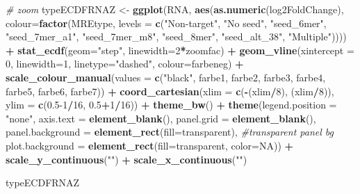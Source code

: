 \documentclass[
]{article}
\newenvironment{Shaded}{\begin{snugshade}}{\end{snugshade}}
\newcommand{\AttributeTok}[1]{\textcolor[rgb]{0.13,0.29,0.53}{#1}}
\newcommand{\CommentTok}[1]{\textcolor[rgb]{0.56,0.35,0.01}{\textit{#1}}}
\newcommand{\ConstantTok}[1]{\textcolor[rgb]{0.56,0.35,0.01}{#1}}
\newcommand{\DecValTok}[1]{\textcolor[rgb]{0.00,0.00,0.81}{#1}}
\newcommand{\FloatTok}[1]{\textcolor[rgb]{0.00,0.00,0.81}{#1}}
\newcommand{\FunctionTok}[1]{\textcolor[rgb]{0.13,0.29,0.53}{\textbf{#1}}}
\newcommand{\NormalTok}[1]{#1}
\newcommand{\OtherTok}[1]{\textcolor[rgb]{0.56,0.35,0.01}{#1}}
\newcommand{\SpecialCharTok}[1]{\textcolor[rgb]{0.81,0.36,0.00}{\textbf{#1}}}
\newcommand{\StringTok}[1]{\textcolor[rgb]{0.31,0.60,0.02}{#1}}
\begin{document}
\begin{Shaded}
\begin{Highlighting}[]
\CommentTok{\# zoom}
\NormalTok{typeECDFRNAZ }\OtherTok{\textless{}{-}} \FunctionTok{ggplot}\NormalTok{(RNA, }\FunctionTok{aes}\NormalTok{(}\FunctionTok{as.numeric}\NormalTok{(log2FoldChange), }
                              \AttributeTok{colour=}\FunctionTok{factor}\NormalTok{(MREtype, }\AttributeTok{levels =} \FunctionTok{c}\NormalTok{(}\StringTok{"Non{-}target"}\NormalTok{, }\StringTok{"No seed"}\NormalTok{, }\StringTok{"seed\_6mer"}\NormalTok{, }\StringTok{"seed\_7mer\_a1"}\NormalTok{, }\StringTok{"seed\_7mer\_m8"}\NormalTok{, }\StringTok{"seed\_8mer"}\NormalTok{, }\StringTok{"seed\_alt\_38"}\NormalTok{, }\StringTok{"Multiple"}\NormalTok{)))) }\SpecialCharTok{+} 
  \FunctionTok{stat\_ecdf}\NormalTok{(}\AttributeTok{geom=}\StringTok{"step"}\NormalTok{, }\AttributeTok{linewidth=}\DecValTok{2}\SpecialCharTok{*}\NormalTok{zoomfac) }\SpecialCharTok{+}
  \FunctionTok{geom\_vline}\NormalTok{(}\AttributeTok{xintercept =} \DecValTok{0}\NormalTok{, }\AttributeTok{linewidth=}\DecValTok{1}\NormalTok{, }\AttributeTok{linetype=}\StringTok{"dashed"}\NormalTok{, }\AttributeTok{colour=}\NormalTok{farbeneg) }\SpecialCharTok{+}
  \FunctionTok{scale\_colour\_manual}\NormalTok{(}\AttributeTok{values =} \FunctionTok{c}\NormalTok{(}\StringTok{"black"}\NormalTok{, farbe1, farbe2, farbe3, farbe4, farbe5, farbe6, farbe7)) }\SpecialCharTok{+}
  \FunctionTok{coord\_cartesian}\NormalTok{(}\AttributeTok{xlim =} \FunctionTok{c}\NormalTok{(}\SpecialCharTok{{-}}\NormalTok{(xlim}\SpecialCharTok{/}\DecValTok{8}\NormalTok{), (xlim}\SpecialCharTok{/}\DecValTok{8}\NormalTok{)), }\AttributeTok{ylim =} \FunctionTok{c}\NormalTok{(}\FloatTok{0.5}\DecValTok{{-}1}\SpecialCharTok{/}\DecValTok{16}\NormalTok{, }\FloatTok{0.5}\SpecialCharTok{+}\DecValTok{1}\SpecialCharTok{/}\DecValTok{16}\NormalTok{)) }\SpecialCharTok{+} 
  \FunctionTok{theme\_bw}\NormalTok{() }\SpecialCharTok{+}
  \FunctionTok{theme}\NormalTok{(}\AttributeTok{legend.position =} \StringTok{"none"}\NormalTok{, }\AttributeTok{axis.text =} \FunctionTok{element\_blank}\NormalTok{(), }\AttributeTok{panel.grid =} \FunctionTok{element\_blank}\NormalTok{(),}
        \AttributeTok{panel.background =} \FunctionTok{element\_rect}\NormalTok{(}\AttributeTok{fill=}\StringTok{\textquotesingle{}transparent\textquotesingle{}}\NormalTok{), }\CommentTok{\#transparent panel bg}
        \AttributeTok{plot.background =} \FunctionTok{element\_rect}\NormalTok{(}\AttributeTok{fill=}\StringTok{\textquotesingle{}transparent\textquotesingle{}}\NormalTok{, }\AttributeTok{color=}\ConstantTok{NA}\NormalTok{)) }\SpecialCharTok{+}
  \FunctionTok{scale\_y\_continuous}\NormalTok{(}\StringTok{""}\NormalTok{) }\SpecialCharTok{+} \FunctionTok{scale\_x\_continuous}\NormalTok{(}\StringTok{""}\NormalTok{)}

\NormalTok{typeECDFRNAZ}
\end{Highlighting}
\end{Shaded}
\end{document}
